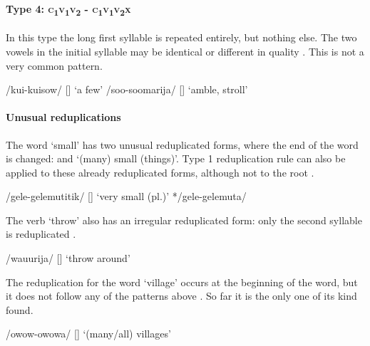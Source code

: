 \paragraph{Type 4:  \textsc{c}\textsubscript{1}\textsc{v}\textsubscript{1}\textsc{v}\textsubscript{2} - \textsc{c}\textsubscript{1}\textsc{v}\textsubscript{1}\textsc{v}\textsubscript{2}\textsc{x}}

In this type the long first syllable is repeated entirely, but nothing else.  The two vowels in the initial syllable may be identical or different in quality . This is not a very common pattern.

\ea
\label{ex:2:reduptypefour}
\ea
/kui-kuisow/  []  `a few'
\ex
/soo-soomarija/  []  `amble, stroll'
\z
\z

\paragraph{Unusual reduplications}

The word  `small' has two unusual reduplicated forms, where the end of the word is changed:  and  `(many) small (things)'.  Type 1 reduplication rule can also be applied to these already reduplicated forms, although not to the root .

\ea
\label{ex:2:redupgelemuta}
\ea
/gele-gelemutitik/  []  `very small (pl.)'
\ex
*/gele-gelemuta/
\z
\z

The verb  `throw' also has an irregular reduplicated form: only the second syllable is reduplicated .

\ea
\label{ex:2:redupwafuriya}
/wa{\textphi}u{\textphi}urija/  []  `throw around'
\z

The reduplication for the word  `village' occurs at the beginning of the word, but it does not follow any of the patterns above . So far it is the only one of its kind found.

\ea
\label{ex:2:redupowowa}
/owow-owowa/  []  `(many/all) villages'
\z

